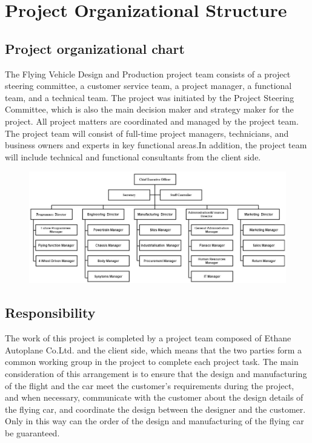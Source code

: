 \chapter{Project Organizational Structure}

\section{Project organizational chart}

The Flying Vehicle Design and Production project team consists of a project steering committee, a customer service team, a project manager, a functional team, and a technical team. The project was initiated by the Project Steering Committee, which is also the main decision maker and strategy maker for the project. All project matters are coordinated and managed by the project team. The project team will consist of full-time project managers, technicians, and business owners and experts in key functional areas.In addition, the project team will include technical and functional consultants from the client side.

\begin{figure}[!htb]
\centering
\includegraphics[width=15cm]{pic/structure.jpg}
\end{figure}

\section{Responsibility}

The work of this project is completed by a project team composed of Ethane Autoplane Co.Ltd. and the client side, which means that the two parties form a common working group in the project to complete each project task. The main consideration of this arrangement is to ensure that the design and manufacturing of the flight and the car meet the customer's requirements during the project, and when necessary, communicate with the customer about the design details of the flying car, and coordinate the design between the designer and the customer. Only in this way can the order of the design and manufacturing of the flying car be guaranteed.

